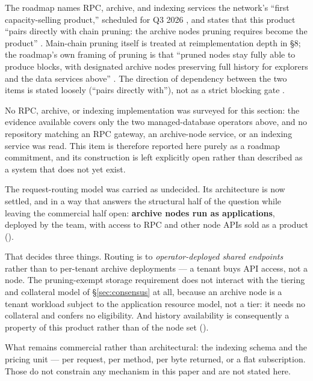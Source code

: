 The roadmap names RPC, archive, and indexing services the network's ``first
capacity-selling product,'' scheduled for Q3 2026
, and states that this product ``pairs
directly with chain pruning: the archive nodes pruning requires become the product''
. Main-chain pruning itself is treated at
reimplementation depth in \S8; the roadmap's own framing of pruning is that ``pruned
nodes stay fully able to produce blocks, with designated archive nodes preserving full
history for explorers and the data services above''
. The direction of dependency between the two
items is stated loosely (``pairs directly with''), not as a strict blocking gate
\srcinferred.

No RPC, archive, or indexing implementation was surveyed for this section: the evidence
available covers only the two managed-database operators above, and no repository
matching an RPC gateway, an archive-node service, or an indexing service was read. This
item is therefore reported here purely as a roadmap commitment, and its construction is
left explicitly open rather than described as a system that does not yet exist.
\begin{remark}
\label{rem:rpc-shape}
The request-routing model was carried as undecided. Its architecture is now settled, and in a way
that answers the structural half of the question while leaving the commercial half open:
\textbf{archive nodes run as \FluxCloud{} applications}, deployed by the team, with access to RPC and
other node APIs sold as a product  (\planned).

That decides three things. Routing is to \emph{operator-deployed shared endpoints} rather than to
per-tenant archive deployments --- a tenant buys API access, not a node. The pruning-exempt storage
requirement does not interact with the tiering and collateral model of \S\ref{sec:consensus} at all,
because an archive node is a tenant workload subject to the application resource model, not a
\FluxNode{} tier: it needs no collateral and confers no eligibility. And history availability is
consequently a property of this product rather than of the node set
().

What remains commercial rather than architectural: the indexing schema and the pricing unit --- per
request, per method, per byte returned, or a flat subscription. Those do not constrain any mechanism
in this paper and are not stated here.
\end{remark}

